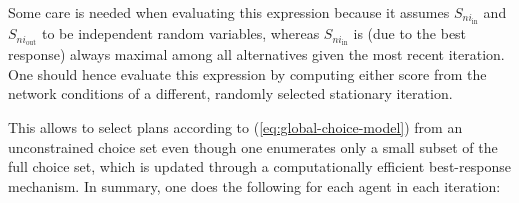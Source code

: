 Some care is needed when evaluating this expression because it assumes
$S_{ni_{\text{in}}}$ and $S_{ni_{\text{out}}}$ to be independent
random variables, whereas $S_{ni_{\text{in}}}$ is (due to the best
response) always maximal among all alternatives given the most recent
iteration. One should hence evaluate this expression by computing
either score from the network conditions of
%
%
a different, randomly selected stationary iteration.
%

This allows to select plans according to (\ref{eq:global-choice-model})
from an unconstrained choice set even though one enumerates only a
small subset of the full choice set, which is updated through a computationally
efficient best-response mechanism.
%
%
%
In summary, one does the following
for each agent in each iteration:
